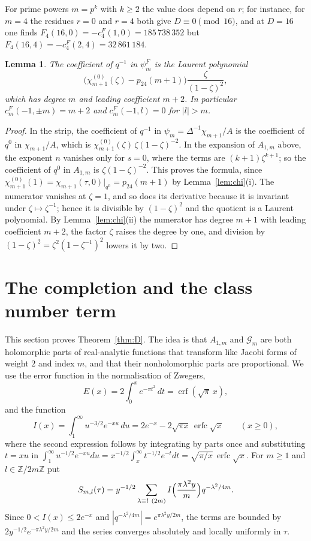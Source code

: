 \documentclass[11pt]{amsart}
\newtheorem{lemma}[theorem]{Lemma}
\theoremstyle{definition}
\newcommand{\ZZ}{\mathbb{Z}}
\newcommand{\pf}{p_{24}}
\newcommand{\cF}{c^{F}}
\newcommand{\erfc}{\operatorname{erfc}}
\begin{document}
For prime powers $m=p^k$ with $k\ge2$ the value does depend on $r$; for instance, for $m=4$ the residues $r=0$ and $r=4$ both give $D\equiv0\pmod{16}$, and at $D=16$ one finds $F_4(16,0)=-\cF_4(1,0)=185\,738\,352$ but $F_4(16,4)=-\cF_4(2,4)=32\,861\,184$.

\begin{lemma}\label{lem:polar}
The coefficient of $q^{-1}$ in $\psi^F_m$ is the Laurent polynomial
\[
\bigl(\chi^{(0)}_{m+1}(\zeta)-\pf(m+1)\bigr)\frac{\zeta}{(1-\zeta)^2},
\]
which has degree $m$ and leading coefficient $m+2$. In particular $\cF_m(-1,\pm m)=m+2$ and $\cF_m(-1,l)=0$ for $|l|>m$.
\end{lemma}

\begin{proof}
In the strip, the coefficient of $q^{-1}$ in $\psi_m=\Delta^{-1}\chi_{m+1}/A$ is the coefficient of $q^0$ in $\chi_{m+1}/A$, which is $\chi^{(0)}_{m+1}(\zeta)\,\zeta(1-\zeta)^{-2}$. In the expansion of $A_{1,m}$ above, the exponent $n$ vanishes only for $s=0$, where the terms are $(k+1)\zeta^{k+1}$; so the coefficient of $q^0$ in $A_{1,m}$ is $\zeta(1-\zeta)^{-2}$. This proves the formula, since $\chi^{(0)}_{m+1}(1)=\chi_{m+1}(\tau,0)|_{q^0}=\pf(m+1)$ by Lemma~\ref{lem:chi}(i). The numerator vanishes at $\zeta=1$, and so does its derivative because it is invariant under $\zeta\mapsto\zeta^{-1}$; hence it is divisible by $(1-\zeta)^2$ and the quotient is a Laurent polynomial. By Lemma~\ref{lem:chi}(ii) the numerator has degree $m+1$ with leading coefficient $m+2$, the factor $\zeta$ raises the degree by one, and division by $(1-\zeta)^2=\zeta^2(1-\zeta^{-1})^2$ lowers it by two.
\end{proof}


\section{The completion and the class number term}\label{sec:completion}

This section proves Theorem~\ref{thm:D}. The idea is that $A_{1,m}$ and $\mathcal G_m$ are both holomorphic parts of real-analytic functions that transform like Jacobi forms of weight $2$ and index $m$, and that their nonholomorphic parts are proportional. We use the error function in the normalisation of Zwegers,
\[
E(x)=2\int_0^x e^{-\pi t^2}\,dt=\operatorname{erf}(\sqrt\pi\,x),
\]
and the function
\begin{equation}\label{eq:Ifun}
I(x)=\int_1^\infty u^{-3/2}e^{-xu}\,du=2e^{-x}-2\sqrt{\pi x}\,\erfc\sqrt x\qquad(x\ge0),
\end{equation}
where the second expression follows by integrating by parts once and substituting $t=xu$ in $\int_1^\infty u^{-1/2}e^{-xu}du=x^{-1/2}\int_x^\infty t^{-1/2}e^{-t}dt=\sqrt{\pi/x}\,\erfc\sqrt x$. For $m\ge1$ and $l\in\ZZ/2m\ZZ$ put
\begin{equation}\label{eq:Sml}
S_{m,l}(\tau)=y^{-1/2}\sum_{\lambda\equiv l\ (2m)}I\Bigl(\frac{\pi\lambda^2y}{m}\Bigr)q^{-\lambda^2/4m}.
\end{equation}
Since $0<I(x)\le 2e^{-x}$ and $|q^{-\lambda^2/4m}|=e^{\pi\lambda^2y/2m}$, the terms are bounded by $2y^{-1/2}e^{-\pi\lambda^2y/2m}$ and the series converges absolutely and locally uniformly in $\tau$.
\end{document}
